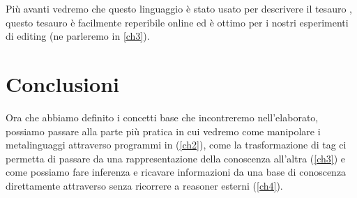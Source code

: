 Più avanti vedremo che questo linguaggio è stato usato per descrivere il tesauro , questo tesauro è facilmente reperibile online ed è ottimo per i nostri esperimenti di editing (ne parleremo in \ref{ch3}).
\section{Conclusioni}
Ora che abbiamo definito i concetti base che incontreremo nell'elaborato, possiamo passare alla parte più pratica in cui vedremo come manipolare i metalinguaggi attraverso programmi in \cduce (\ref{ch2}), come la trasformazione di tag ci permetta di passare da una rappresentazione della conoscenza all'altra (\ref{ch3}) e come possiamo fare inferenza e ricavare informazioni da una base di conoscenza direttamente attraverso \cduce senza ricorrere a reasoner esterni (\ref{ch4}).